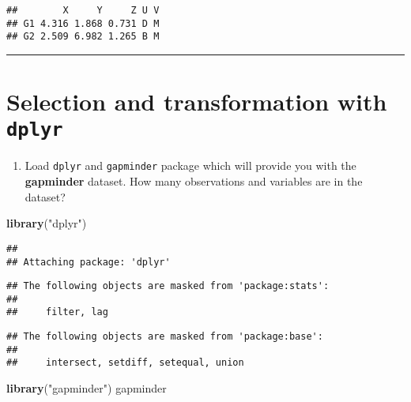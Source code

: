 \documentclass[]{article}
\newenvironment{Shaded}{\begin{snugshade}}{\end{snugshade}}
\newcommand{\KeywordTok}[1]{\textcolor[rgb]{0.13,0.29,0.53}{\textbf{#1}}}
\newcommand{\StringTok}[1]{\textcolor[rgb]{0.31,0.60,0.02}{#1}}
\newcommand{\NormalTok}[1]{#1}
\providecommand{\tightlist}{%
  \setlength{\itemsep}{0pt}\setlength{\parskip}{0pt}}
\begin{document}
\begin{verbatim}
##        X     Y     Z U V
## G1 4.316 1.868 0.731 D M
## G2 2.509 6.982 1.265 B M
\end{verbatim}

\begin{center}\rule{0.5\linewidth}{\linethickness}\end{center}

\section{\texorpdfstring{Selection and transformation with
\texttt{dplyr}}{Selection and transformation with dplyr}}\label{selection-and-transformation-with-dplyr}

\begin{enumerate}
\def\labelenumi{\arabic{enumi}.}
\tightlist
\item
  Load \texttt{dplyr} and \texttt{gapminder} package which will provide
  you with the \textbf{gapminder} dataset. How many observations and
  variables are in the dataset?
\end{enumerate}

\begin{Shaded}
\begin{Highlighting}[]
\KeywordTok{library}\NormalTok{(}\StringTok{"dplyr"}\NormalTok{)}
\end{Highlighting}
\end{Shaded}

\begin{verbatim}
## 
## Attaching package: 'dplyr'
\end{verbatim}

\begin{verbatim}
## The following objects are masked from 'package:stats':
## 
##     filter, lag
\end{verbatim}

\begin{verbatim}
## The following objects are masked from 'package:base':
## 
##     intersect, setdiff, setequal, union
\end{verbatim}

\begin{Shaded}
\begin{Highlighting}[]
\KeywordTok{library}\NormalTok{(}\StringTok{"gapminder"}\NormalTok{)}
\NormalTok{gapminder}
\end{Highlighting}
\end{Shaded}
\end{document}
